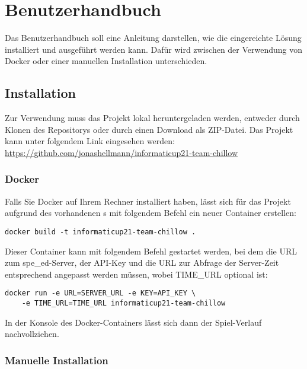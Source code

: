 \chapter{Benutzerhandbuch}
\label{ch:benutzerhandbuch}

Das Benutzerhandbuch soll eine Anleitung darstellen, wie die eingereichte Lösung installiert und ausgeführt werden kann.
Dafür wird zwischen der Verwendung von Docker oder einer manuellen Installation unterschieden.

\section{Installation}
\label{sec:installation}

Zur Verwendung muss das Projekt lokal heruntergeladen werden, entweder durch Klonen des Repositorys oder durch einen
Download als ZIP-Datei.
Das Projekt kann unter folgendem Link eingesehen werden:
\url{https://github.com/jonashellmann/informaticup21-team-chillow}

\subsection{Docker}
\label{subsec:docker}

Falls Sie Docker auf Ihrem Rechner installiert haben, lässt sich für das Projekt aufgrund des vorhandenen
s mit folgendem Befehl ein neuer Container erstellen:

\begin{verbatim}
docker build -t informaticup21-team-chillow .
\end{verbatim}

Dieser Container kann mit folgendem Befehl gestartet werden, bei dem die URL zum spe\_ed-Server, der API-Key und die URL
zur Abfrage der Server-Zeit entsprechend angepasst werden müssen, wobei TIME\_URL optional ist:

\begin{verbatim}
docker run -e URL=SERVER_URL -e KEY=API_KEY \
    -e TIME_URL=TIME_URL informaticup21-team-chillow
\end{verbatim}

In der Konsole des Docker-Containers lässt sich dann der Spiel-Verlauf nachvollziehen.

\subsection{Manuelle Installation}
\label{subsec:manuelle-installation}

